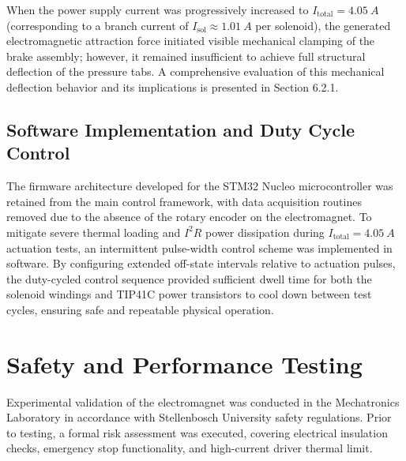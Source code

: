 When the power supply current was progressively increased to $I_{\text{total}} = \SI{4.05}{A}$ (corresponding to a branch current of $I_{\text{sol}} \approx \SI{1.01}{A}$ per solenoid), the generated electromagnetic attraction force initiated visible mechanical clamping of the brake assembly; however, it remained insufficient to achieve full structural deflection of the pressure tabs. A comprehensive evaluation of this mechanical deflection behavior and its implications is presented in Section 6.2.1.

\subsection{Software Implementation and Duty Cycle Control}

The firmware architecture developed for the STM32 Nucleo microcontroller was retained from the main control framework, with data acquisition routines removed due to the absence of the rotary encoder on the electromagnet. To mitigate severe thermal loading and $I^2 R$ power dissipation during $I_{\text{total}} = \SI{4.05}{A}$ actuation tests, an intermittent pulse-width control scheme was implemented in software. By configuring extended off-state intervals relative to actuation pulses, the duty-cycled control sequence provided sufficient dwell time for both the solenoid windings and TIP41C power transistors to cool down between test cycles, ensuring safe and repeatable physical operation.

\section{Safety and Performance Testing}

Experimental validation of the electromagnet was conducted in the Mechatronics Laboratory in accordance with Stellenbosch University safety regulations. Prior to testing, a formal risk assessment was executed, covering electrical insulation checks, emergency stop functionality, and high-current driver thermal limit.

